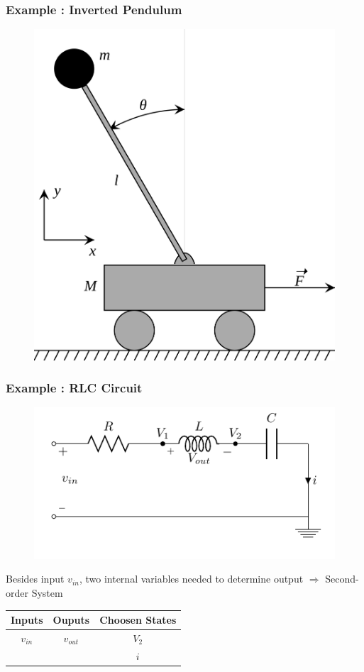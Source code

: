 \begin{frame}
	\frametitle{Example : Inverted Pendulum}
	\begin{figure}
	\centering
	\includegraphics[width=0.6\linewidth]{img/pendulum-inverted}
	\label{fig:pendulum-inverted}
	\end{figure}
\end{frame}

\begin{frame}
	\frametitle{Example : RLC Circuit}
	
		\begin{figure}
		\centering
		\includegraphics[width=0.7\linewidth]{img/circuit-RLC}
		\label{fig:circuit-RLC}
		\end{figure}
		Besides input $v_{in}$, two internal variables needed to determine output $\Rightarrow$ Second-order System
		\begin{center}
			\begin{tabular}{c@{\hskip 1cm} c@{\hskip 1cm} c}
				Inputs 	& Ouputs 	& Choosen States \\ \hline
				$v_{in}$ 	& $v_{out}$	& $V_2$ \\
				& & $i$ \\ 
			\end{tabular}
		\end{center}
		
\end{frame}

